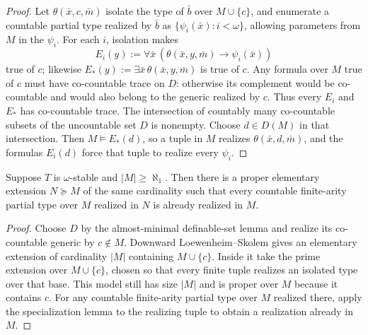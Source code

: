 \begin{proof}
Let \(\theta(\bar x,c,\bar m)\) isolate the type of \(\bar b\) over
\(M\cup\{c\}\), and enumerate a countable partial type realized by
\(\bar b\) as \(\{\psi_i(\bar x):i<\omega\}\), allowing parameters
from \(M\) in the \(\psi_i\).  For each \(i\), isolation makes
\[
  E_i(y):=\forall\bar x\,
  (\theta(\bar x,y,\bar m)\to\psi_i(\bar x))
\]
true of \(c\); likewise
\(E_*(y):=\exists\bar x\,\theta(\bar x,y,\bar m)\) is true of \(c\).
Any formula over \(M\) true of \(c\) must have co-countable trace on
\(D\): otherwise its complement would be co-countable and would also
belong to the generic realized by \(c\).  Thus every \(E_i\) and
\(E_*\) has co-countable trace.  The intersection of countably many
co-countable subsets of the uncountable set \(D\) is nonempty.  Choose
\(d\in D(M)\) in that intersection.  Then \(M\models E_*(d)\), so a
tuple in \(M\) realizes \(\theta(\bar x,d,\bar m)\), and the formulas
\(E_i(d)\) force that tuple to realize every \(\psi_i\).
\end{proof}

\begin{lemma}
\label{lem:proper-extension-realizes-no-new-countable-types}
Suppose \(T\) is \(\omega\)-stable and \(|M|\geq\aleph_1\).  Then there
is a proper elementary extension \(N\succeq M\) of the same cardinality
such that every countable finite-arity partial type over \(M\) realized
in \(N\) is already realized in \(M\).
\end{lemma}

\begin{proof}
Choose \(D\) by the almost-minimal definable-set lemma and realize its
co-countable generic by \(c\notin M\).  Downward Loewenheim--Skolem gives
an elementary extension of cardinality \(|M|\) containing
\(M\cup\{c\}\).  Inside it take the prime extension over
\(M\cup\{c\}\), chosen so that every finite tuple realizes an isolated
type over that base.  This model still has size \(|M|\) and is proper
over \(M\) because it contains \(c\).  For any countable finite-arity
partial type over \(M\) realized there, apply the specialization lemma
to the realizing tuple to obtain a realization already in \(M\).
\end{proof}

